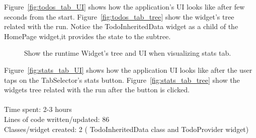 Figure~\ref{fig:todos_tab_UI} shows how the application's UI looks like after few seconds from the start. Figure~\ref{fig:todos_tab_tree} show the widget's tree related with the run. Notice the TodoInheritedData widget as a child of the HomePage widget,it provides the state to the subtree.
\begin{figure}[H]
    \centering
    \quad
    \caption{Show the runtime Widget's tree and UI when visualizing stats tab.}
    \label{fig:stats_tab}
\end{figure}

Figure~\ref{fig:stats_tab_UI} shows how the application UI looks like after the user taps on the TabSelector's stats button. Figure~\ref{fig:stats_tab_tree} show the widgets tree related with the run after the button is clicked.\\
\\
Time spent: 2-3 hours\\
Lines of code written/updated: 86\\
Classes/widget created: 2 ( TodoInheritedData class and TodoProvider widget)\\



